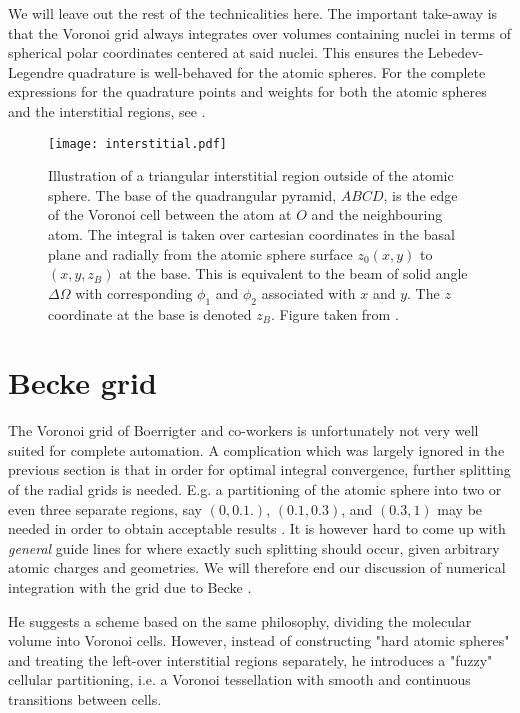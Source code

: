 \documentclass[../../master.tex]{subfiles}
\begin{document}
We will leave out the rest of the technicalities here. The important take-away is that the Voronoi grid always integrates over volumes containing nuclei in terms of spherical polar coordinates centered at said nuclei. This ensures the Lebedev-Legendre quadrature is well-behaved for the atomic spheres. For the complete expressions for the quadrature points and weights for both the atomic spheres and the interstitial regions, see \cite{voronoi2}.

\begin{SCfigure}
\centering
\texttt{[image: interstitial.pdf]}
\caption{Illustration of a triangular interstitial region outside of the atomic sphere. The base of the quadrangular pyramid, $ABCD$, is the edge of the Voronoi cell between the atom at $O$ and the neighbouring atom. The integral is taken over cartesian coordinates in the basal plane and radially from the atomic sphere surface $z_0(x,y)$ to $(x,y,z_B)$ at the base. This is equivalent to the beam of solid angle $\Delta \Omega$ with corresponding $\phi_1$ and $\phi_2$ associated with $x$ and $y$. The $z$ coordinate at the base is denoted $z_B$.  Figure taken from \cite{voronoi2}.\label{fig:dft4}}
\end{SCfigure}

\section{Becke grid}
The Voronoi grid of Boerrigter and co-workers is unfortunately not very well suited for complete automation. A complication which was largely ignored in the previous section is that in order for optimal integral convergence, further splitting of the radial grids is needed. E.g. a partitioning of the atomic sphere into two or even three separate regions, say $(0,0.1.)$, $(0.1,0.3)$, and $(0.3,1)$ may be needed in order to obtain acceptable results \cite{voronoi1}. It is however hard to come up with \emph{general} guide lines for where exactly such splitting should occur, given arbitrary atomic charges and geometries. We will therefore end our discussion of numerical integration with the grid due to Becke \cite{beckegrid}.

He suggests a scheme based on the same philosophy, dividing the molecular volume into Voronoi cells. However, instead of constructing "hard atomic spheres" and treating the left-over interstitial regions separately, he introduces a "fuzzy" cellular partitioning, i.e. a Voronoi tessellation with smooth and continuous transitions between cells. 
\end{document}
